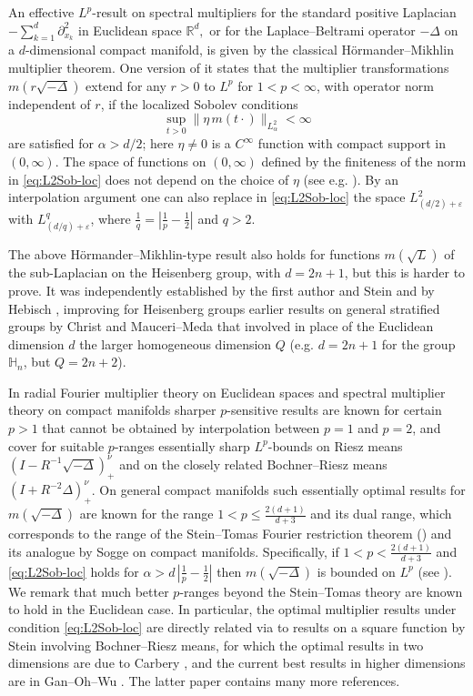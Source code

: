 \documentclass[leqno]{amsart}
\theoremstyle{definition}
\theoremstyle{remark}
\numberwithin{equation}{section}
\newcommand{\eps}{\varepsilon}
\newcommand\bbH{{\mathbb {H}}}
\newcommand\bbR{{\mathbb {R}}}
\begin{document}
An effective $L^p$-result on spectral multipliers for the standard positive Laplacian $- \sum_{k=1}^d \partial_{x_k}^2$ in Euclidean space $\bbR^d,$ or for the Laplace--Beltrami operator  $-\Delta$ on a $d$-dimensional compact manifold,   is given by the classical Hörmander--Mikhlin multiplier theorem. One version of it states that  the multiplier transformations $m(r\sqrt{-\Delta}) $ extend  for any $r>0$  to $L^p$  for $1<p<\infty$,  with operator norm independent of $r$,  if the localized Sobolev conditions
\begin{equation}  \label{eq:L2Sob-loc} 
\sup_{t>0}  \| \eta \, m(t\cdot)\|_{L^2_\alpha} <\infty
\end{equation} 
are satisfied for $\alpha>d/2$; here $\eta\neq 0$ is a  $C^\infty$ function with compact support in $(0,\infty)$. The space of functions on $(0,\infty)$ defined by the finiteness of the norm in  \eqref{eq:L2Sob-loc} does  not depend on  the choice of $\eta$ (see e.g. \cite{CarberyGasperTrebels-JAT}).  By an interpolation argument  one can also replace in \eqref{eq:L2Sob-loc}  the space $L^2_{(d/2)+\eps}$ with $L^q_{(d/q)+\eps}$, where $\frac 1q=|\frac 1p-\frac 12|$ and $q>2$.

The above  Hörmander--Mikhlin-type result also holds for functions $m(\sqrt L)$ of the sub-Laplacian   on the Heisenberg group, with $d=2n+1$,  but this is  harder to prove. It was independently established  by the first author and Stein  \cite{MuellerStein-mult}   and by Hebisch  \cite{He93}, improving for  Heisenberg groups earlier results on general stratified groups by Christ \cite{Ch91} and  Mauceri--Meda \cite{MaMe90} that  involved in place of the Euclidean dimension $d$ the larger  homogeneous dimension $Q$ (e.g.  $d=2n+1$ for the group  $\bbH_n$,  but  $Q=2n+2$).

In radial Fourier multiplier theory on Euclidean spaces and spectral multiplier theory on compact  manifolds  sharper $p$-sensitive results are known for certain $p>1$ that cannot be obtained by interpolation between $p=1$  and $p=2$, and cover for  suitable $p$-ranges  essentially sharp $L^p$-bounds  on  Riesz means $(I-R^{-1} \sqrt{-\Delta})_+^\nu $  and on  the closely  related Bochner--Riesz means $(I+R^{-2} \Delta)_+^\nu$.
 On general compact manifolds such essentially optimal results for $m(\sqrt{-\Delta})$ are known for the  range  $1<p\le \frac{2(d+1)}{d+3}$ and its dual range, which corresponds to the range of the Stein--Tomas Fourier restriction theorem (\cite{tomas, SteinBeijing})  and its analogue by Sogge \cite{Sogge-spectral1988} on compact manifolds.
Specifically,  if $1<p<\frac{2(d+1)}{d+3}$ and \eqref{eq:L2Sob-loc} holds for $\alpha>d\,|\frac 1p-\frac 12|$ then $m(\sqrt{-\Delta})$ is bounded on $L^p$ (see \cite{SeegerSogge-mult}).  
 We remark that much better $p$-ranges beyond the  Stein--Tomas theory are known to hold in the Euclidean case. In particular,  the optimal multiplier results under condition \eqref{eq:L2Sob-loc} are directly  related via \cite{CarberyGasperTrebels} to results on a square function by Stein involving Bochner--Riesz means, for which the optimal results in two dimensions are due to Carbery \cite{Carbery1983}, and the current best results in higher dimensions are in  Gan--Oh--Wu \cite{GanOhWu}. The latter paper contains many more references. 
\end{document}
